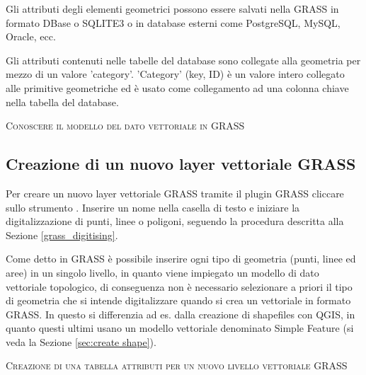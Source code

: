 Gli attributi degli elementi geometrici possono essere salvati nella
 GRASS in formato DBase o SQLITE3 o in database esterni
come PostgreSQL, MySQL, Oracle, ecc.

Gli attributi contenuti nelle tabelle del database sono collegate  alla
geometria per mezzo di un valore 'category'.
'Category' (key, ID) è un valore intero collegato alle primitive geometriche
ed è usato come collegamento ad una colonna chiave nella tabella del database.

\begin{Tip}\caption{\textsc{Conoscere il modello del dato vettoriale in GRASS}}
\end{Tip} 

\subsection{Creazione di un nuovo layer vettoriale GRASS}\label{sec:creating_new_grass_vectors}

Per creare un nuovo layer vettoriale GRASS tramite il plugin GRASS cliccare
sullo strumento . 
Inserire un nome nella casella di testo e iniziare la digitalizzazione di
punti, linee o poligoni, seguendo la procedura descritta alla Sezione
\ref{grass_digitising}. 

Come detto in GRASS è possibile inserire ogni tipo di geometria (punti, linee
ed aree) in un singolo livello, in quanto viene impiegato un modello di dato
vettoriale topologico, di conseguenza non è necessario selezionare a priori il tipo di
geometria che si intende digitalizzare quando si crea un vettoriale in formato
GRASS. In questo si differenzia ad es. dalla creazione di shapefiles con QGIS,
in quanto questi ultimi usano un modello vettoriale denominato Simple Feature
(si veda la Sezione \ref{sec:create shape}).

\begin{Tip}\caption{\textsc{Creazione di una tabella attributi per un nuovo
livello vettoriale GRASS}}
\end{Tip} 


